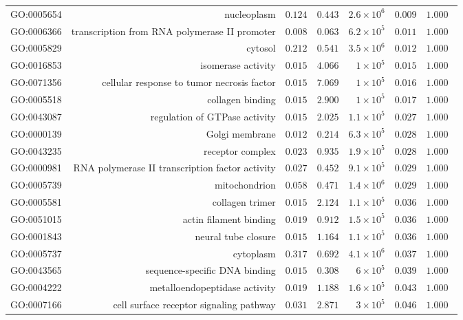 \documentclass{article}
\begin{document}
\begin{longtable}{|l|r|r|r|r|r|r|}
GO:0005654 & nucleoplasm & $ 0.124$ & $ 0.443$ & $2.6\times 10^{6}$ & $ 0.009$ & $ 1.000~~$ \\
GO:0006366 & transcription from RNA polymerase II promoter & $ 0.008$ & $ 0.063$ & $6.2\times 10^{5}$ & $ 0.011$ & $ 1.000~~$ \\
GO:0005829 & cytosol & $ 0.212$ & $ 0.541$ & $3.5\times 10^{6}$ & $ 0.012$ & $ 1.000~~$ \\
GO:0016853 & isomerase activity & $ 0.015$ & $ 4.066$ & $ 1\times 10^{5}$ & $ 0.015$ & $ 1.000~~$ \\
GO:0071356 & cellular response to tumor necrosis factor & $ 0.015$ & $ 7.069$ & $ 1\times 10^{5}$ & $ 0.016$ & $ 1.000~~$ \\
GO:0005518 & collagen binding & $ 0.015$ & $ 2.900$ & $ 1\times 10^{5}$ & $ 0.017$ & $ 1.000~~$ \\
GO:0043087 & regulation of GTPase activity & $ 0.015$ & $ 2.025$ & $1.1\times 10^{5}$ & $ 0.027$ & $ 1.000~~$ \\
GO:0000139 & Golgi membrane & $ 0.012$ & $ 0.214$ & $6.3\times 10^{5}$ & $ 0.028$ & $ 1.000~~$ \\
GO:0043235 & receptor complex & $ 0.023$ & $ 0.935$ & $1.9\times 10^{5}$ & $ 0.028$ & $ 1.000~~$ \\
GO:0000981 & RNA polymerase II transcription factor activity & $ 0.027$ & $ 0.452$ & $9.1\times 10^{5}$ & $ 0.029$ & $ 1.000~~$ \\
GO:0005739 & mitochondrion & $ 0.058$ & $ 0.471$ & $1.4\times 10^{6}$ & $ 0.029$ & $ 1.000~~$ \\
GO:0005581 & collagen trimer & $ 0.015$ & $ 2.124$ & $1.1\times 10^{5}$ & $ 0.036$ & $ 1.000~~$ \\
GO:0051015 & actin filament binding & $ 0.019$ & $ 0.912$ & $1.5\times 10^{5}$ & $ 0.036$ & $ 1.000~~$ \\
GO:0001843 & neural tube closure & $ 0.015$ & $ 1.164$ & $1.1\times 10^{5}$ & $ 0.036$ & $ 1.000~~$ \\
GO:0005737 & cytoplasm & $ 0.317$ & $ 0.692$ & $4.1\times 10^{6}$ & $ 0.037$ & $ 1.000~~$ \\
GO:0043565 & sequence-specific DNA binding & $ 0.015$ & $ 0.308$ & $ 6\times 10^{5}$ & $ 0.039$ & $ 1.000~~$ \\
GO:0004222 & metalloendopeptidase activity & $ 0.019$ & $ 1.188$ & $1.6\times 10^{5}$ & $ 0.043$ & $ 1.000~~$ \\
GO:0007166 & cell surface receptor signaling pathway & $ 0.031$ & $ 2.871$ & $ 3\times 10^{5}$ & $ 0.046$ & $ 1.000~~$ \\

\end{longtable}
\end{document}
